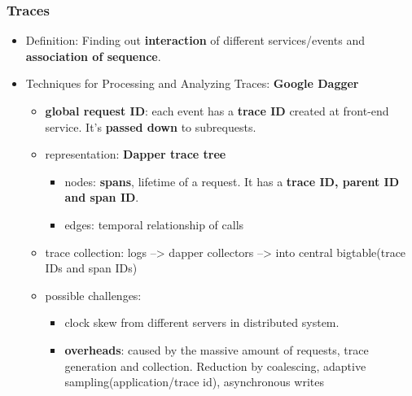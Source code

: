 \subsubsection{Traces}
\begin{itemize}
	\item Definition: Finding out \textbf{interaction} of different services/events and \textbf{association of sequence}.
	\item Techniques for Processing and Analyzing Traces: \textbf{Google Dagger}
	\begin{itemize}
		\item \textbf{global request ID}: each event has a \textbf{trace ID} created at front-end service. It's \textbf{passed down} to subrequests.
		\item representation: \textbf{Dapper trace tree}
		\begin{itemize}
			\item nodes: \textbf{spans}, lifetime of a request. It has a \textbf{trace ID, parent ID and span ID}.
			\item edges: temporal relationship of calls
		\end{itemize}
		\item trace collection: logs --> dapper collectors --> into central bigtable(trace IDs and span IDs)
	
	
		\item possible challenges: 
		\begin{itemize}
			\item clock skew from different servers in distributed system.
			\item \textbf{overheads}: caused by the massive amount of requests, trace generation and collection. Reduction by coalescing, adaptive sampling(application/trace id), asynchronous writes 
		\end{itemize}
		
		
	\end{itemize}
\end{itemize}




















